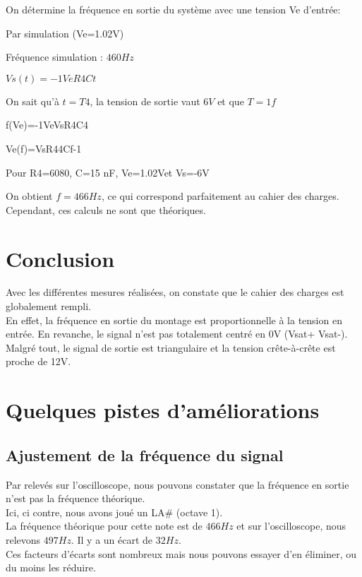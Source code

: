 {On détermine la fréquence en sortie du système avec une tension Ve d’entrée:

Par simulation (Ve=1.02V)



Fréquence simulation : $460 Hz$


$Vs(t)=-1VeR4Ct$  

On sait qu’à $t=T4$, la tension de sortie vaut $6V$ et que $T=1f$

f(Ve)=-1VeVsR4C4


Ve(f)=VsR44Cf-1

Pour R4=6080, C=15 nF, Ve=1.02Vet Vs=-6V

On obtient $f=466 Hz$, ce qui correspond parfaitement au cahier des charges.
Cependant, ces calculs ne sont que théoriques.\chapter{Conclusion}

Avec les différentes mesures réalisées, on constate que le cahier des charges est globalement rempli.\\
En effet, la fréquence en sortie du montage est proportionnelle à la tension en entrée. En revanche, le signal n’est pas totalement centré en 0V (Vsat+ Vsat-). \\
Malgré tout, le signal de sortie est triangulaire et la tension crête-à-crête est proche de 12V.\\\chapter{Quelques pistes d’améliorations}
\section{Ajustement de la fréquence du signal}

Par relevés sur l’oscilloscope, nous pouvons constater que la fréquence en sortie n’est pas la fréquence théorique. \\

Ici, ci contre, nous avons joué un LA\# (octave 1).\\
La fréquence théorique pour cette note est de $466 Hz$ et sur l’oscilloscope, nous relevons $497 Hz$. Il y a un écart de $32 Hz$. \\


Ces facteurs d’écarts sont nombreux mais nous pouvons essayer d’en éliminer, ou du moins les réduire. \\

}
